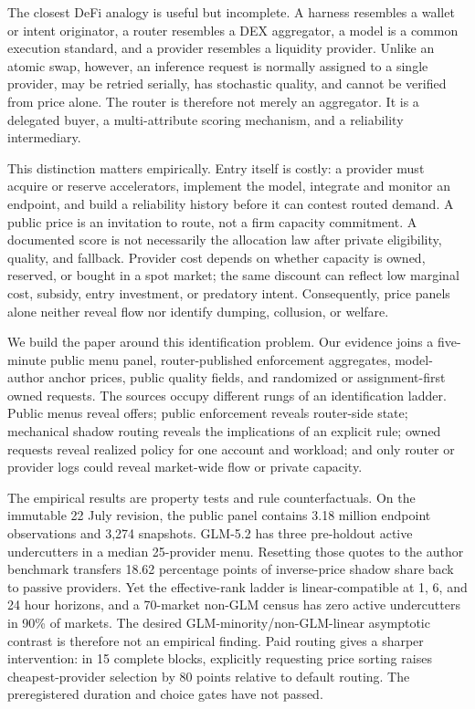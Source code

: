 \documentclass[sigconf,nonacm]{acmart}
\newcommand{\1}{\mathbf 1}
\begin{document}
The closest DeFi analogy is useful but incomplete.  A harness resembles a
wallet or intent originator, a router resembles a DEX aggregator, a model is a
common execution standard, and a provider resembles a liquidity provider.
Unlike an atomic swap, however, an inference request is normally assigned to a
single provider, may be retried serially, has stochastic quality, and cannot be
verified from price alone.  The router is therefore not merely an aggregator.
It is a delegated buyer, a multi-attribute scoring mechanism, and a reliability
intermediary.

This distinction matters empirically.  Entry itself is costly: a provider must
acquire or reserve accelerators, implement the model, integrate and monitor an
endpoint, and build a reliability history before it can contest routed demand.
A public price is an invitation to route,
not a firm capacity commitment.  A documented score is not necessarily the
allocation law after private eligibility, quality, and fallback.  Provider cost
depends on whether capacity is owned, reserved, or bought in a spot market; the
same discount can reflect low marginal cost, subsidy, entry investment, or
predatory intent.  Consequently, price panels alone neither reveal flow nor
identify dumping, collusion, or welfare.

We build the paper around this identification problem.  Our evidence joins a
five-minute public menu panel, router-published enforcement aggregates, model-
author anchor prices, public quality fields, and randomized or assignment-first
owned requests.  The sources occupy different rungs of an identification
ladder.  Public menus reveal offers; public enforcement reveals router-side
state; mechanical shadow routing reveals the implications of an explicit rule;
owned requests reveal realized policy for one account and workload; and only
router or provider logs could reveal market-wide flow or private capacity.

The empirical results are property tests and rule counterfactuals.  On the
immutable 22 July revision, the public panel contains 3.18 million endpoint
observations and 3,274 snapshots.  GLM-5.2 has three pre-holdout active
undercutters in a median 25-provider menu.  Resetting those quotes to the author
benchmark transfers 18.62 percentage points of inverse-price shadow share back
to passive providers.  Yet the effective-rank ladder is linear-compatible at
1, 6, and 24 hour horizons, and a 70-market non-GLM census has zero active
undercutters in 90\% of markets.  The desired GLM-minority/non-GLM-linear
asymptotic contrast is therefore not an empirical finding.  Paid routing gives
a sharper intervention: in 15 complete blocks, explicitly requesting price
sorting raises cheapest-provider selection by 80 points relative to default
routing.  The preregistered duration and choice gates have not passed.
\end{document}
